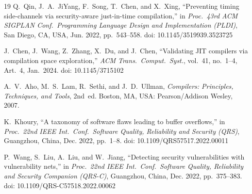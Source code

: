 \documentclass[conference]{IEEEtran}
\begin{document}
\begin{thebibliography}{19}
Q.~Qin, J.~A.~JiYang, F.~Song, T.~Chen, and X.~Xing,
``Preventing timing side-channels via security-aware just-in-time
compilation,''
in \emph{Proc.\ 43rd ACM SIGPLAN Conf.\ Programming Language Design
and Implementation (PLDI)}, San Diego, CA, USA, Jun. 2022,
pp.~543--558.
doi: 10.1145/3519939.3523725

J.~Chen, J.~Wang, Z.~Zhang, X.~Du, and J.~Chen,
``Validating {JIT} compilers via compilation space exploration,''
\emph{ACM Trans.\ Comput.\ Syst.}, vol.~41, no.~1--4, Art.~4,
Jan.~2024.
doi: 10.1145/3715102

A.~V.~Aho, M.~S.~Lam, R.~Sethi, and J.~D.~Ullman,
\emph{Compilers: Principles, Techniques, and Tools}, 2nd~ed.
Boston, MA, USA: Pearson/Addison Wesley, 2007.

K.~Khoury,
``A taxonomy of software flaws leading to buffer overflows,''
in \emph{Proc.\ 22nd IEEE Int.\ Conf.\ Software Quality, Reliability
and Security (QRS)}, Guangzhou, China, Dec. 2022, pp.~1--8.
doi: 10.1109/QRS57517.2022.00011

P.~Wang, S.~Liu, A.~Liu, and W.~Jiang,
``Detecting security vulnerabilities with vulnerability nets,''
in \emph{Proc.\ 22nd IEEE Int.\ Conf.\ Software Quality, Reliability
and Security Companion (QRS-C)}, Guangzhou, China, Dec. 2022,
pp.~375--383.
doi: 10.1109/QRS-C57518.2022.00062

\end{thebibliography}
\end{document}
